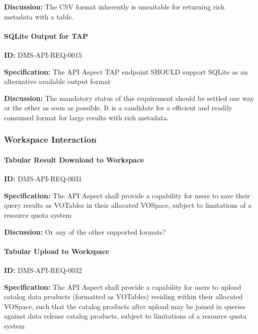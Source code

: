 \documentclass[SE,toc]{lsstdoc}
\begin{document}
\textbf{Discussion:}
The CSV format inherently is unsuitable for returning rich metadata with a table.

\paragraph{SQLite Output for TAP}\hfill  %

\label{DMS-API-REQ-0015}
\textbf{ID:} DMS-API-REQ-0015

\textbf{Specification:}
The API Aspect TAP endpoint SHOULD support SQLite as an alternative available output format

\textbf{Discussion:}
The mandatory status of this requirement should be settled one way or the other as soon as possible.  It is a candidate for a efficient and readily consumed format for large results with rich metadata.

\subsubsection{Workspace Interaction}

\paragraph{Tabular Result Download to Workspace}\hfill  %

\label{DMS-API-REQ-0031}
\textbf{ID:} DMS-API-REQ-0031

\textbf{Specification:}
The API Aspect shall provide a capability for users to save their query results as VOTables in their allocated VOSpace, subject to limitations of a resource quota system

\textbf{Discussion:}
Or any of the other supported formats?

\paragraph{Tabular Upload to Workspace}\hfill  %

\label{DMS-API-REQ-0032}
\textbf{ID:} DMS-API-REQ-0032

\textbf{Specification:}
The API Aspect shall provide a capability for users to upload catalog data products (formatted as VOTables) residing within their allocated VOSpace, such that the catalog products after upload may be joined in queries against data release catalog products, subject to limitations of a resource quota system
\end{document}
